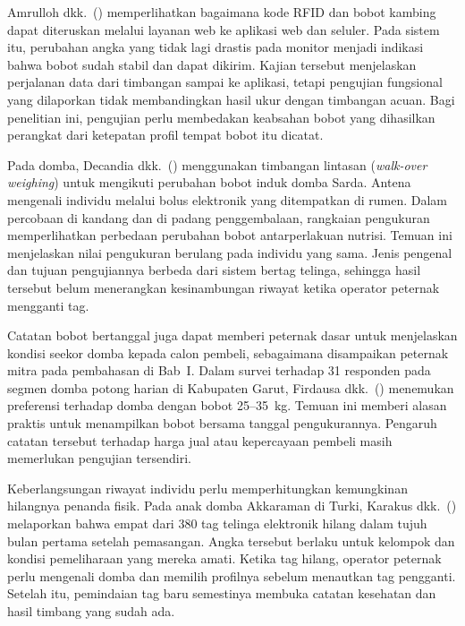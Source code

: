 Amrulloh dkk.~(\citeyear{amrulloh2024integrasi}) memperlihatkan bagaimana kode RFID
dan bobot kambing dapat diteruskan melalui layanan web ke aplikasi web dan seluler.
Pada sistem itu, perubahan angka yang tidak lagi drastis pada monitor menjadi indikasi
bahwa bobot sudah stabil dan dapat dikirim. Kajian tersebut menjelaskan perjalanan
data dari timbangan sampai ke aplikasi, tetapi pengujian fungsional yang dilaporkan
tidak membandingkan hasil ukur dengan timbangan acuan. Bagi penelitian ini, pengujian
perlu membedakan keabsahan bobot yang dihasilkan perangkat dari ketepatan profil
tempat bobot itu dicatat.

Pada domba, Decandia dkk.~(\citeyear{decandia2026domba}) menggunakan timbangan
lintasan (\textit{walk-over weighing}) untuk mengikuti perubahan bobot induk domba
Sarda. Antena mengenali individu melalui bolus elektronik yang ditempatkan di rumen.
Dalam percobaan di kandang dan di padang penggembalaan, rangkaian pengukuran
memperlihatkan perbedaan perubahan bobot antarperlakuan nutrisi. Temuan ini
menjelaskan nilai pengukuran berulang pada individu yang sama. Jenis pengenal dan
tujuan pengujiannya berbeda dari sistem bertag telinga, sehingga hasil tersebut belum
menerangkan kesinambungan riwayat ketika {\setlength{\fboxsep}{1pt}\colorbox{revisilama}{operator}} {\setlength{\fboxsep}{1pt}\colorbox{revisibaru}{peternak}} mengganti tag.

Catatan bobot bertanggal juga dapat memberi peternak dasar untuk menjelaskan kondisi
seekor domba kepada calon pembeli, sebagaimana disampaikan peternak mitra pada
pembahasan di Bab~I. Dalam survei terhadap 31 responden pada segmen domba potong
harian di Kabupaten Garut, Firdausa dkk.~(\citeyear{firdausa2026preferensi}) menemukan
preferensi terhadap domba dengan bobot 25--35~kg. Temuan ini memberi alasan praktis
untuk menampilkan bobot bersama tanggal pengukurannya. Pengaruh catatan tersebut
terhadap harga jual atau kepercayaan pembeli masih memerlukan pengujian tersendiri.

Keberlangsungan riwayat individu perlu memperhitungkan kemungkinan hilangnya penanda
fisik. Pada anak domba Akkaraman di Turki, Karakus dkk.~(\citeyear{karakus2015tag})
melaporkan bahwa empat dari 380 tag telinga elektronik hilang dalam tujuh bulan
pertama setelah pemasangan. Angka tersebut berlaku untuk kelompok dan kondisi
pemeliharaan yang mereka amati. Ketika tag hilang, {\setlength{\fboxsep}{1pt}\colorbox{revisilama}{operator}} {\setlength{\fboxsep}{1pt}\colorbox{revisibaru}{peternak}} perlu mengenali domba
dan memilih profilnya sebelum menautkan tag pengganti. Setelah itu, pemindaian tag
baru semestinya membuka catatan kesehatan dan hasil timbang yang sudah ada.

